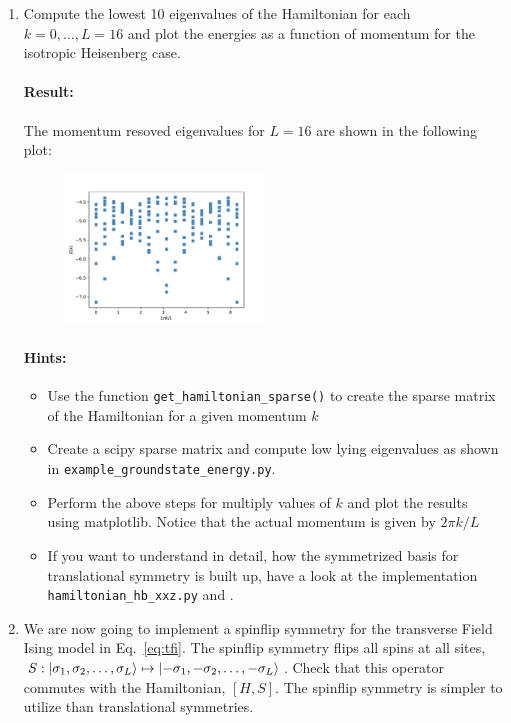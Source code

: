\documentclass[]{article}
\theoremstyle{definition}
\begin{document}
\begin{enumerate}
\item Compute the lowest 10 eigenvalues of the Hamiltonian for each
  $k = 0, \ldots, L=16$ and plot the energies as a function of
  momentum for the isotropic Heisenberg case.
  \paragraph{Result:}
  The momentum resoved eigenvalues for $L=16$ are shown in the
  following plot:
  \begin{figure}[H]
    \centering
    \includegraphics[width=0.5\textwidth]{spectra_hbchain_16_kresolved.pdf}
  \end{figure}
  \paragraph{Hints:}
  \begin{itemize}
  \item Use the function \texttt{get\_hamiltonian\_sparse()} to create
    the sparse matrix of the Hamiltonian for a given momentum $k$
  \item Create a scipy sparse matrix and compute low lying eigenvalues
    as shown in \texttt{example\_groundstate\_energy.py}.
  \item Perform the above steps for multiply values of $k$ and plot
    the results using matplotlib. Notice that the actual momentum is
    given by $2\pi k /L$
  \item If you want to understand in detail, how the symmetrized basis
    for translational symmetry is built up, have a look at the
    implementation \texttt{hamiltonian\_hb\_xxz.py} and \cite{weise}.
  \end{itemize}
\item We are now going to implement a spinflip symmetry for the
  transverse Field Ising model in Eq.~\ref{eq:tfi}. The spinflip
  symmetry flips all spins at all sites,
  $S: \ket{\sigma_1, \sigma_2, \ldots, \sigma_L} \mapsto
  \ket{-\sigma_1, -\sigma_2, \ldots, -\sigma_L}$. Check that this
  operator commutes with the Hamiltonian, $[H,S]$. The spinflip
  symmetry is simpler to utilize than translational symmetries.


\end{enumerate}
\end{document}
